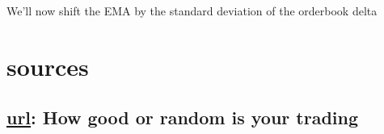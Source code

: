 \documentclass[12pt]{article}
\begin{document}
We'll now shift the EMA by the standard deviation of the orderbook delta 





\newpage
\section*{sources}
\subsection*{\href{https://x.com/HangukQuant/status/1930603876069335120}{url}: How good or random is your trading}
\end{document}
